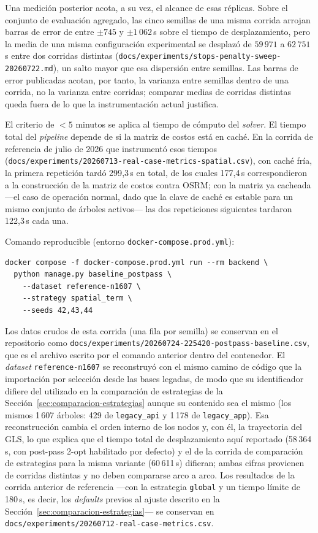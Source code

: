 Una medición posterior acota, a su vez, el alcance de esas réplicas. Sobre el
conjunto de evaluación agregado, las cinco semillas de una misma corrida arrojan
barras de error de entre $\pm 745$ y $\pm 1\,062$\,s sobre el tiempo de
desplazamiento, pero la media de una misma configuración experimental se desplazó
de $59\,971$ a $62\,751$\,s entre dos corridas distintas
(\texttt{docs/experiments/stops-penalty-sweep-20260722.md}), un salto mayor que
esa dispersión entre semillas. Las barras de error publicadas acotan, por tanto,
la varianza entre semillas dentro de una corrida, no la varianza entre corridas;
comparar medias de corridas distintas queda fuera de lo que la instrumentación
actual justifica.

El criterio de $< 5$ minutos se aplica al tiempo de cómputo del \textit{solver}. El
tiempo total del \textit{pipeline} depende de si la matriz de costos está en
caché. En la corrida de referencia de julio de 2026 que instrumentó esos tiempos
(\texttt{docs/experiments/20260713-real-case-metrics-spatial.csv}), con caché
fría, la primera repetición tardó 299{,}3\,s en total, de los cuales 177{,}4\,s
correspondieron a la construcción de la matriz de costos contra OSRM; con la
matriz ya cacheada ---el caso de operación normal, dado que la clave de caché es
estable para un mismo conjunto de árboles activos--- las dos repeticiones
siguientes tardaron 122{,}3\,s cada una.

Comando reproducible (entorno \texttt{docker-compose.prod.yml}):

\begin{verbatim}
docker compose -f docker-compose.prod.yml run --rm backend \
  python manage.py baseline_postpass \
    --dataset reference-n1607 \
    --strategy spatial_term \
    --seeds 42,43,44
\end{verbatim}

Los datos crudos de esta corrida (una fila por semilla) se conservan en el
repositorio como
\texttt{docs/experiments/20260724-225420-postpass-baseline.csv}, que es el
archivo escrito por el comando anterior dentro del contenedor. El
\textit{dataset} \texttt{reference-n1607} se reconstruyó con el mismo camino de
código que la importación por selección desde las bases legadas, de modo que su
identificador difiere del utilizado en la comparación de estrategias de la
Sección~\ref{sec:comparacion-estrategias} aunque su contenido sea el mismo (los mismos
1\,607 árboles: 429 de \texttt{legacy\_api} y 1\,178 de \texttt{legacy\_app}).
Esa reconstrucción cambia el orden interno de los nodos y, con él, la
trayectoria del GLS, lo que explica que el tiempo total de desplazamiento aquí
reportado (58\,364\,s, con post-pass 2-opt habilitado por defecto) y el de la corrida
de comparación de estrategias para la misma variante (60\,611\,s) difieran;
ambas cifras provienen de corridas distintas y no deben compararse arco a arco. Los
resultados de la corrida anterior de referencia ---con la estrategia \texttt{global}
y un tiempo límite de 180\,s, es decir, los \textit{defaults} previos al ajuste
descrito en la Sección~\ref{sec:comparacion-estrategias}--- se conservan en
\texttt{docs/experiments/20260712-real-case-metrics.csv}.

